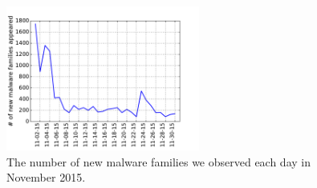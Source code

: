 \begin{figure}[t!]
\begin{center}
\includegraphics[width=2.5in]{figure/new_family}
\caption{The number of new malware families we observed each day in November 2015.}
\label{fig:new}
\end{center}
\end{figure}
